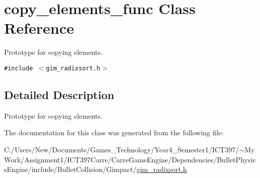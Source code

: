 \hypertarget{classcopy__elements__func}{
\section{copy\_\-elements\_\-func Class Reference}
\label{classcopy__elements__func}
}
Prototype for copying elements.  


{\tt \#include $<$gim\_\-radixsort.h$>$}



\subsection{Detailed Description}
Prototype for copying elements. 

The documentation for this class was generated from the following file:\begin{CompactItemize}
\item 
C:/Users/New/Documents/Games\_\-Technology/Year4\_\-Semester1/ICT397/$\sim$My Work/Assignment1/ICT397Carre/CarreGameEngine/Dependencies/BulletPhysicsEngine/include/BulletCollision/Gimpact/\hyperlink{gim__radixsort_8h}{gim\_\-radixsort.h}\end{CompactItemize}
